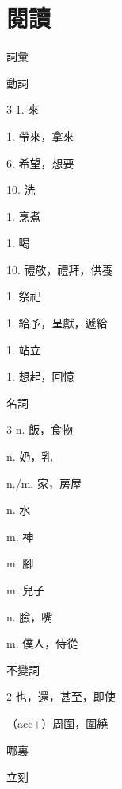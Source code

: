 \documentclass[aspectratio=169]{beamer}
\begin{document}
\section{閱讀}
\begin{frame}{詞彙}
    \footnotesize
    \begin{block}{動詞}
        \begin{VocabCols}{3}
             1.  來
            
             1.  帶來，拿來
            
             6.  希望，想要
            
             10.  洗
            
             1.  烹煮
            
             1.  喝
            
             10.  禮敬，禮拜，供養
            
             1.  祭祀
            
             1.  給予，呈獻，遞給
            
             1.  站立
            
             1.  想起，回憶
        \end{VocabCols}
    \end{block}

    \begin{block}{名詞}
        \begin{VocabCols}{3}
             n. 飯，食物
            
             n. 奶，乳
            
             n./m. 家，房屋
            
             n. 水
            
             m. 神
            
             m. 腳
            
             m. 兒子
            
             n. 臉，嘴
            
             m. 僕人，侍從
        \end{VocabCols}
    \end{block}

    \begin{block}{不變詞}
        \begin{VocabCols}{2}
             也，還，甚至，即使
            
             （acc+）周圍，圍繞
            
             哪裏
            
             立刻
        \end{VocabCols}
    \end{block}
\end{frame}
\end{document}
